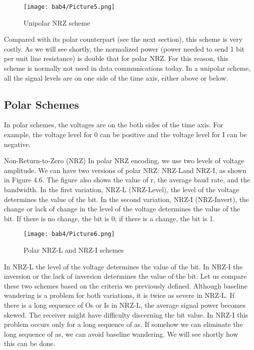 \begin{figure}
  \centering
  \texttt{[image: bab4/Picture5.png]}
  \caption{Unipolar NRZ scheme}
  \label{fig4:5}
\end{figure}

Compared with its polar counterpart (see the next section), this scheme is very costly. As we will see shortly, the normalized power (power needed to send 1 bit per unit line resistance) is double that for polar NRZ. For this reason, this scheme is normally not used in data communications today. In a unipolar scheme, all the signal levels are on one side of the time axis, either above or below.

\subsection*{Polar Schemes}
In polar schemes, the voltages are on the both sides of the time axis. For example, the voltage level for 0 can be positive and the voltage level for I can be negative.

Non-Return-to-Zero (NRZ) In polar NRZ encoding, we use two levels of voltage amplitude. We can have two versions of polar NRZ: NRZ-Land NRZ-I, as shown in Figure 4.6. The figure also shows the value of r, the average baud rate, and the bandwidth. In the first variation, NRZ-L (NRZ-Level), the level of the voltage determines the value of the bit. In the second variation, NRZ-I (NRZ-Invert), the change or lack of change in the level of the voltage determines the value of the bit. If there is no change, the bit is 0; if there is a change, the bit is 1.

\begin{figure}
  \centering
  \texttt{[image: bab4/Picture6.png]}
  \caption{Polar NRZ-L and NRZ-I schemes}
  \label{fig4:6}
\end{figure}

In NRZ-L the level of the voltage determines the value of the bit. In NRZ-I the inversion or the lack of inversion determines the value of the bit. Let us compare these two schemes based on the criteria we previously defined. Although baseline wandering is a problem for both variations, it is twice as severe in NRZ-L. If there is a long sequence of Os or Is in NRZ-L, the average signal power becomes skewed. The receiver might have difficulty discerning the bit value. In NRZ-I this problem occurs only for a long sequence of as. If somehow we can eliminate the long sequence of as, we can avoid baseline wandering. We will see shortly how this can be done.

